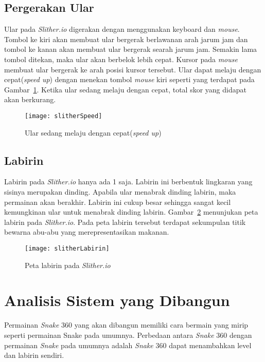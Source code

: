 \subsection{Pergerakan Ular}
Ular pada \textit{Slither.io} digerakan dengan menggunakan keyboard dan \textit{mouse}. Tombol ke kiri akan membuat ular bergerak berlawanan arah jarum jam dan tombol ke kanan akan membuat ular bergerak searah jarum jam. Semakin lama tombol ditekan, maka ular akan berbelok lebih cepat. Kursor pada \textit{mouse} membuat ular bergerak ke arah posisi kursor tersebut. Ular dapat melaju dengan cepat(\textit{speed up}) dengan menekan tombol \textit{mouse} kiri seperti yang terdapat pada Gambar~\ref{fig:slitherSpeed}. Ketika ular sedang melaju dengan cepat, total skor yang didapat akan berkurang. 

\begin{figure}[H]
	\centering  
	\texttt{[image: slitherSpeed]}  
	\caption[Ular sedang melaju dengan cepat(\textit{speed up})]{Ular sedang melaju dengan cepat(\textit{speed up})}
	\label{fig:slitherSpeed} 
\end{figure}

\subsection{Labirin}
Labirin pada \textit{Slither.io} hanya ada 1 saja. Labirin ini berbentuk lingkaran yang sisinya merupakan dinding. Apabila ular menabrak dinding labirin, maka permainan akan berakhir. Labirin ini cukup besar sehingga sangat kecil kemungkinan ular untuk menabrak dinding labirin. Gambar~\ref{fig:slitherLabirin} menunjukan peta labirin pada \textit{Slither.io}. Pada peta labirin tersebut terdapat sekumpulan titik bewarna abu-abu yang merepresentasikan makanan.

\begin{figure}[H]
	\centering  
	\texttt{[image: slitherLabirin]}  
	\caption[Peta labirin pada \textit{Slither.io}]{Peta labirin pada \textit{Slither.io}}
	\label{fig:slitherLabirin} 
\end{figure}

\section{Analisis Sistem yang Dibangun}
Permainan \textit{Snake} 360 yang akan dibangun memiliki cara bermain yang mirip seperti permainan Snake pada umumnya. Perbedaan antara \textit{Snake} 360 dengan permainan \textit{Snake} pada umumnya adalah \textit{Snake} 360 dapat menambahkan level dan labirin sendiri. 

